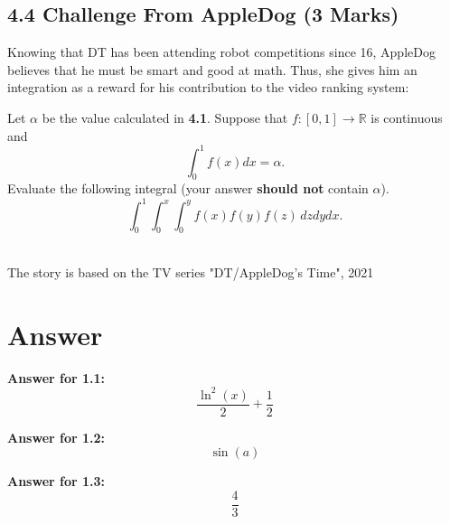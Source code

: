 \documentclass[12pt]{article}
\renewcommand{\emph}[1]{{\color{Turquoise3}\textsl{#1}}}
\begin{document}
\subsection*{4.4 Challenge From AppleDog (3 Marks)}
\par Knowing that DT has been attending robot competitions since 16, AppleDog believes that he must be smart and good at math. Thus, she gives him an integration as a reward for his contribution to the video ranking system: 
\par Let \emph{$\alpha$} be the value calculated in \textbf{4.1}. Suppose that $f:[0,1] \to \mathbb{R}$ is continuous and 
\begin{equation*}
    \int_0^1 f(x) dx = \alpha. 
\end{equation*}
Evaluate the following integral (your answer \textbf{should not} contain \emph{$\alpha$}). 
\begin{equation*}
    \int_0^1 \int_0^x \int_0^y f(x)f(y)f(z)\,dzdydx. 
\end{equation*} 
~\\ 

\begin{flushright}
    The story is based on the TV series "DT/AppleDog's Time", 2021
\end{flushright}


\newpage
\section*{Answer}

\par \textbf{Answer for 1.1: }
\begin{equation*}
    \frac{\ln^2(x)}{2} + \frac{1}{2}
\end{equation*}

\par \textbf{Answer for 1.2: }
\begin{equation*}
    \sin(a)
\end{equation*}

\par \textbf{Answer for 1.3: }
\begin{equation*}
    \frac{4}{3}
\end{equation*}
\end{document}
